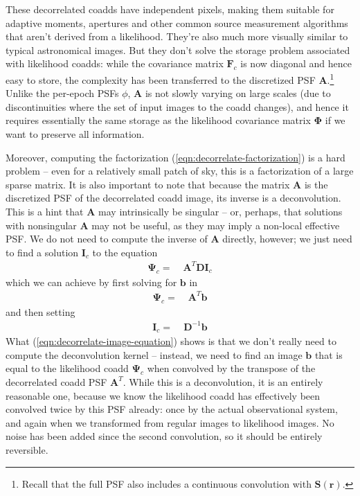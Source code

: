 \documentclass[10pt]{article}
\newcommand{\eqnref}[1]{(\ref{eqn:#1})}
\begin{document}
These decorrelated coadds have independent pixels, making them suitable for adaptive moments, apertures and other common source measurement algorithms that aren't derived from a likelihood.  They're also much more visually similar to typical astronomical images.  But they don't solve the storage problem associated with likelihood coadds: while the covariance matrix $\bm{F}_c$ is now diagonal and hence easy to store, the complexity has been transferred to the discretized PSF $\bm{A}$.\footnote{Recall that the full PSF also includes a continuous convolution with $\bm{S}(\bm{r})$.}  Unlike the per-epoch PSFs $\phi$, $\bm{A}$ is not slowly varying on large scales (due to discontinuities where the set of input images to the coadd changes), and hence it requires essentially the same storage as the likelihood covariance matrix $\bm{\Phi}$ if we want to preserve all information.

Moreover, computing the factorization \eqnref{decorrelate-factorization} is a hard problem -- even for a relatively small patch of sky, this is a factorization of a large sparse matrix.  It is also important to note that because the matrix $\bm{A}$ is the discretized PSF of the decorrelated coadd image, its inverse is a deconvolution.  This is a hint that $\bm{A}$ may intrinsically be singular -- or, perhaps, that solutions with nonsingular $\bm{A}$ may not be useful, as they may imply a non-local effective PSF.  We do not need to compute the inverse of $\bm{A}$ directly, however; we just need to find a solution $\bm{I}_c$ to the equation
\begin{align}
\bm{\Psi}_c =\;& \bm{A}^{T}\bm{D}\bm{I}_c
\end{align}
which we can achieve by first solving for $\bm{b}$ in
\begin{align}
\bm{\Psi}_c =\;& \bm{A}^{T}\bm{b}
\label{eqn:decorrelate-image-equation}
\end{align}
and then setting
\begin{align}
\bm{I}_c =\;& \bm{D}^{-1}\bm{b}
\end{align}
What \eqnref{decorrelate-image-equation} shows is that we don't really need to compute the deconvolution kernel -- instead, we need to find an image $\bm{b}$ that is equal to the likelihood coadd $\bm{\Psi}_c$ when convolved by the transpose of the decorrelated coadd PSF $\bm{A}^T$.  While this is a deconvolution, it is an entirely reasonable one, because we know the likelihood coadd has effectively been convolved twice by this PSF already: once by the actual observational system, and again when we transformed from regular images to likelihood images.  No noise has been added since the second convolution, so it should be entirely reversible.
\end{document}

